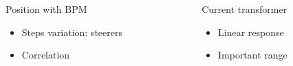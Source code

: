 \begin{frame}[t]
\begin{columns}[T]
    \begin{column}{0.45\textwidth}
      \begin{block}{Position with BPM}
        \begin{itemize}
          \item Steps variation: steerers
          \item Correlation
        \end{itemize}
      \end{block}
    \end{column}
    \begin{column}{0.45\textwidth}
      \begin{block}{Current transformer}
        \begin{itemize}
          \item Linear response
          \item Important range
        \end{itemize}
      \end{block}
    \end{column}
  \end{columns}
\end{frame}

